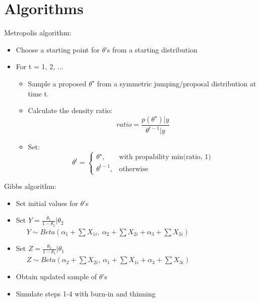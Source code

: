 \documentclass[11pt,a4paper]{article}
\begin{document}
\newpage


\section*{Algorithms}
Metropolis algorithm: 
\begin{itemize}
\item Choose a starting point for $\theta$'s from a starting distribution
\item For t = 1, 2, $\dots$
	\begin{itemize}
		\item Sample a proposed $\theta^{\star}$ from a symmetric jumping/proposal distribution at time t. 
		\item Calculate the density ratio: \\
		\begin{equation}
			ratio = \frac{p(\theta^{\star})|y}{\theta^{t-1}|y}
		\end{equation}
		\item   Set:\begin{equation}
    				\theta^t=
    				\begin{cases}
             		\theta^{\star}, & \text{with propability min(ratio, 1)} \\
   		 	  		\theta^{t-1}, & \text{otherwise}
   		 			\end{cases}
  			    \end{equation}

	\end{itemize}
\end{itemize}
Gibbs algorithm:
\begin{itemize}
	\item Set initial values for $\theta$'s
	\item Set $Y = \frac{\theta_{1}}{1-\theta_{2}}|\theta_{2}$\\
	\ \ \ $Y \sim Beta(\alpha_{1}+\sum{X_{1i}}, \ \alpha_{2}+\sum{X_{2i}} + \alpha_{3}+\sum{X_{3i}})$
	\item Set $Z = \frac{\theta_{2}}{1-\theta_{1}}|\theta_{1}$\\
	\ \ \ $Z \sim Beta(\alpha_{2}+\sum{X_{2i}}, \ \alpha_{1}+\sum{X_{1i}} + \alpha_{3}+\sum{X_{3i}})$
	\item Obtain updated sample of $\theta$'s
	\item Simulate steps 1-4 with burn-in and thinning
\end{itemize}
\end{document}
